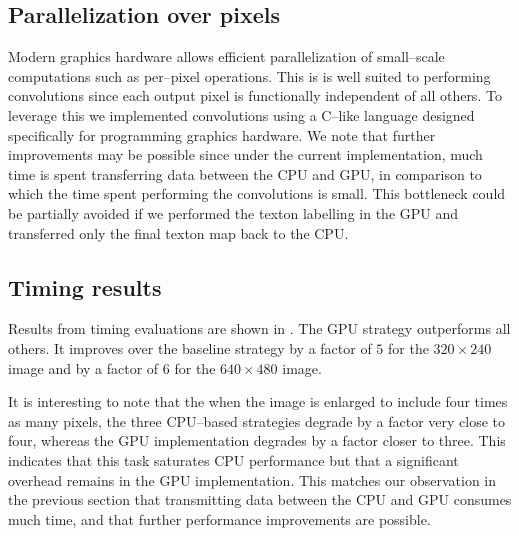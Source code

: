 \subsection{Parallelization over pixels}
Modern graphics hardware allows efficient parallelization of
small--scale computations such as per--pixel operations. This is is
well suited to performing convolutions since each output pixel is
functionally independent of all others. To leverage this we
implemented convolutions using a C--like language designed
specifically for programming graphics hardware. We note that further
improvements may be possible since under the current implementation,
much time is spent transferring data between the CPU and GPU, in
comparison to which the time spent performing the convolutions is
small. This bottleneck could be partially avoided if we performed the
texton labelling in the GPU and transferred only the final texton map
back to the CPU.

\subsection{Timing results}
Results from timing evaluations are shown in
. The GPU strategy outperforms all
others. It improves over the baseline strategy by a factor of $5$ for
the $320 \times 240$ image and by a factor of $6$ for the $640 \times
480$ image.

It is interesting to note that the when the image is enlarged to
include four times as many pixels, the three CPU--based strategies
degrade by a factor very close to four, whereas the GPU implementation
degrades by a factor closer to three. This indicates that this task
saturates CPU performance but that a significant overhead remains in
the GPU implementation. This matches our observation in the previous
section that transmitting data between the CPU and GPU consumes much
time, and that further performance improvements are possible.



